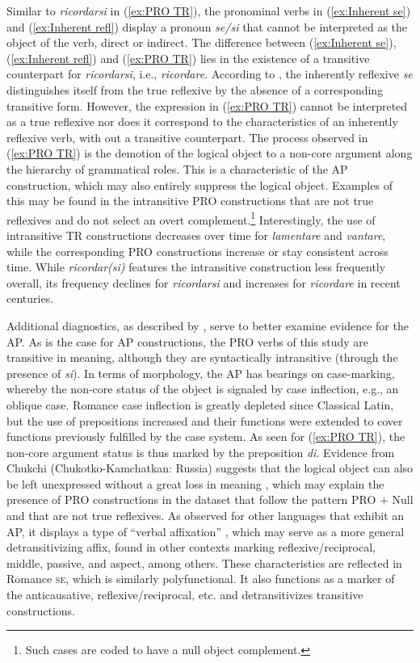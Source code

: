 \documentclass[output=paper,colorlinks,citecolor=brown]{langscibook}
\begin{document}
Similar to \textit{ricordarsi} in (\ref{ex:PRO TR}), the pronominal verbs in (\ref{ex:Inherent se}) and (\ref{ex:Inherent refl}) display a pronoun \textit{se/si} that cannot be interpreted as the object of the verb, direct or indirect. The difference between (\ref{ex:Inherent se}), (\ref{ex:Inherent refl}) and (\ref{ex:PRO TR}) lies in the existence of a transitive counterpart for \textit{ricordarsi}, i.e., \textit{ricordare}. According to \citet[8]{medova_reflexive_2009}, the inherently reflexive \textit{se} distinguishes itself from the true reflexive by the absence of a corresponding transitive form. However, the expression in (\ref{ex:PRO TR}) cannot be interpreted as a true reflexive nor does it correspond to the characteristics of an inherently reflexive verb, with out a transitive counterpart. The process observed in (\ref{ex:PRO TR}) is the demotion of the logical object to a non-core argument along the hierarchy of grammatical roles. This is a characteristic of the AP construction, which may also entirely suppress the logical object. Examples of this may be found in the intransitive PRO constructions that are not true reflexives and do not select an overt complement.\footnote{Such cases are coded to have a null object complement.} Interestingly, the use of intransitive TR constructions decreases over time for \textit{lamentare} and \textit{vantare}, while the corresponding PRO constructions increase or stay consistent across time. While \textit{ricordar(si)} features the intransitive construction less frequently overall, its frequency declines for \textit{ricordarsi} and increases for \textit{ricordare} in recent centuries.

Additional diagnostics, as described by \citet{polinsky_13._2017}, serve to better examine evidence for the AP. As is the case for AP constructions, the PRO verbs of this study are transitive in meaning, although they are syntactically intransitive (through the presence of \textit{si}). In terms of morphology, the AP has bearings on case-marking, whereby the non-core status of the object is signaled by case inflection, e.g., an oblique case. Romance case inflection is greatly depleted since Classical Latin, but the use of prepositions increased and their functions were extended to cover functions previously fulfilled by the case system. As seen for (\ref{ex:PRO TR}), the non-core argument status is thus marked by the preposition \textit{di}. Evidence from Chukchi (Chukotko-Kamchatkan: Russia) suggests that the logical object can also be left unexpressed without a great loss in meaning \citep[7]{polinsky_13._2017}, which may explain the presence of PRO constructions in the dataset that follow the pattern PRO + Null and that are not true reflexives. As observed for other languages that exhibit an AP, it displays a type of “verbal affixation” \citep[7]{polinsky_13._2017}, which may serve as a more general detransitivizing affix, found in other contexts marking reflexive/reciprocal, middle, passive, and aspect, among others. These characteristics are reflected in Romance \textsc{se}, which is similarly polyfunctional. It also functions as a marker of the anticausative, reflexive/reciprocal, etc. and detransitivizes transitive constructions.
\end{document}
